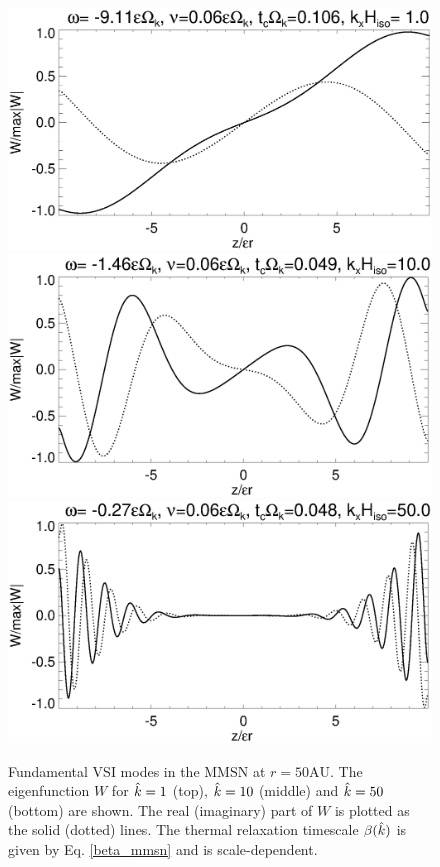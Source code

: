 \begin{figure}
   \includegraphics[width=\linewidth,clip=true,trim=0cm 1.75cm 0cm
  0cm]{figures/eigenvectorW_mmsnkx1.ps}
  \includegraphics[width=\linewidth,clip=true,trim=0cm 1.75cm 0cm
  0cm]{figures/eigenvectorW_mmsnkx10.ps} 
  \includegraphics[width=\linewidth,clip=true,trim=0cm 0cm 0cm
  0cm]{figures/eigenvectorW_mmsnkx50.ps} 
  \caption{Fundamental VSI modes in the MMSN at
    $r=50\mathrm{AU}$. The eigenfunction $W$ for $\hat{k}=1$ (top),
    $\hat{k}=10$ 
    (middle) and $\hat{k}=50$ (bottom) are shown. The real (imaginary)
    part of $W$ is plotted as the solid (dotted)
    lines. The thermal relaxation timescale $\beta(\hat{k})$ is given by
    Eq. \ref{beta_mmsn} and is scale-dependent. \label{mmsn_eigenW}}    
\end{figure}

